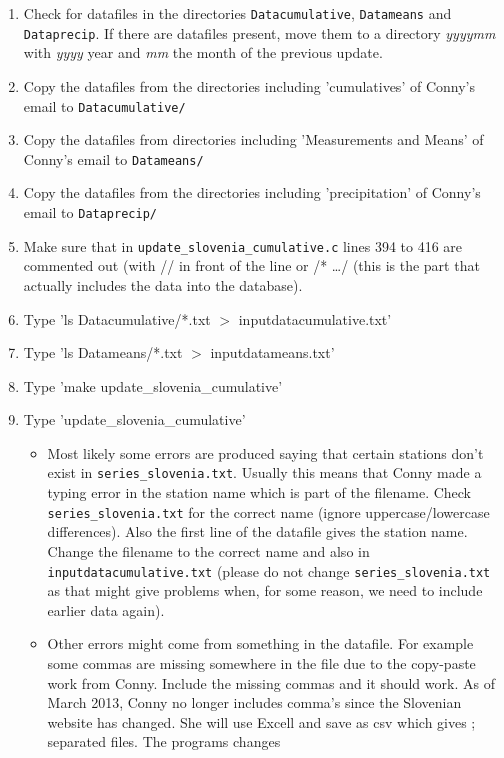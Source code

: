 \documentclass[a4paper]{article}
\begin{document}
\begin{enumerate}
\item Check for datafiles in the directories \texttt{Datacumulative},
  \texttt{Datameans} and \texttt{Dataprecip}. If there are datafiles
  present, move them to a directory \textit{yyyymm} with \textit{yyyy}
  year and \textit{mm} the month of the previous update.
\item Copy the datafiles from the directories including 'cumulatives'
  of Conny's email to \texttt{Datacumulative/}
\item Copy the datafiles from directories including 'Measurements and
  Means' of Conny's email to \texttt{Datameans/}
\item Copy the datafiles from the directories including
  'precipitation' of Conny's email to \texttt{Dataprecip/}
\item Make sure that in \texttt{update\_slovenia\_cumulative.c} lines
  394 to 416 are commented out (with // in front of the line or /*
  \dots */ (this is the part that actually includes the data into the
  database).
\item Type 'ls Datacumulative/*.txt $>$ inputdatacumulative.txt'
\item Type 'ls Datameans/*.txt $>$ inputdatameans.txt'
\item Type 'make update\_slovenia\_cumulative'
\item Type 'update\_slovenia\_cumulative'
  \begin{itemize}
  \item Most likely some errors are produced saying that certain
    stations don't exist in \texttt{series\_slovenia.txt}. Usually
    this means that Conny made a typing error in the station name
    which is part of the filename. Check \texttt{series\_slovenia.txt}
    for the correct name (ignore uppercase/lowercase
    differences). Also the first line of the datafile gives the
    station name. Change the filename to the correct name and also in
    \texttt{inputdatacumulative.txt} (please do not change
    \texttt{series\_slovenia.txt} as that might give problems when,
    for some reason, we need to include earlier data again).
  \item Other errors might come from something in the datafile. For
    example some commas are missing somewhere in the file due to the
    copy-paste work from Conny. Include the missing commas and it
    should work. As of March 2013, Conny no longer includes comma's
    since the Slovenian website has changed. She will use Excell and
    save as csv which gives ; separated files. The programs changes

\end{itemize}
\end{enumerate}
\end{document}
